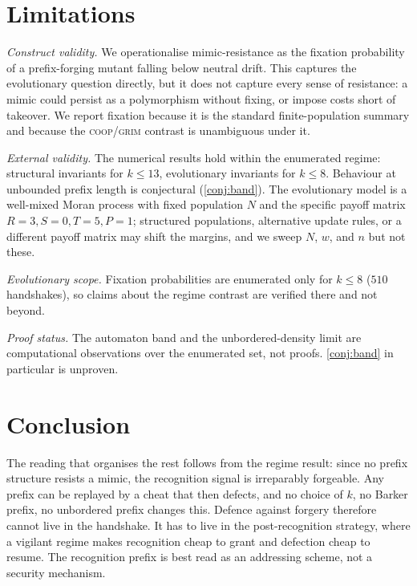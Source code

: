 \section{Limitations}\label{sec:limits}

\emph{Construct validity.} We operationalise mimic-resistance as the fixation probability of a
prefix-forging mutant falling below neutral drift. This captures the evolutionary question
directly, but it does not capture every sense of resistance: a mimic could persist as a
polymorphism without fixing, or impose costs short of takeover. We report fixation because it
is the standard finite-population summary \citep{nowak2004,moran1958} and because the
\textsc{coop}/\textsc{grim} contrast is unambiguous under it.

\emph{External validity.} The numerical results hold within the enumerated regime: structural
invariants for $k\le 13$, evolutionary invariants for $k\le 8$. Behaviour at unbounded prefix
length is conjectural (\cref{conj:band}). The evolutionary model is a well-mixed Moran process
with fixed population $N$ and the specific payoff matrix $R=3, S=0, T=5, P=1$; structured
populations, alternative update rules, or a different payoff matrix may shift the margins, and
we sweep $N$, $w$, and $n$ but not these.

\emph{Evolutionary scope.} Fixation probabilities are enumerated only for $k\le 8$ ($510$
handshakes), so claims about the regime contrast are verified there and not beyond.

\emph{Proof status.} The automaton band and the unbordered-density limit are computational
observations over the enumerated set, not proofs. \cref{conj:band} in particular is
unproven.

\section{Conclusion}\label{sec:conclusion}

The reading that organises the rest follows from the regime result: since no prefix structure
resists a mimic, the recognition signal is irreparably forgeable. Any prefix can be replayed
by a cheat that then defects, and no choice of $k$, no Barker prefix, no unbordered prefix
changes this. Defence against forgery therefore cannot live in the handshake. It has to live
in the post-recognition strategy, where a vigilant regime makes recognition cheap to grant and
defection cheap to resume. The recognition prefix is best read as an addressing scheme, not a
security mechanism.

